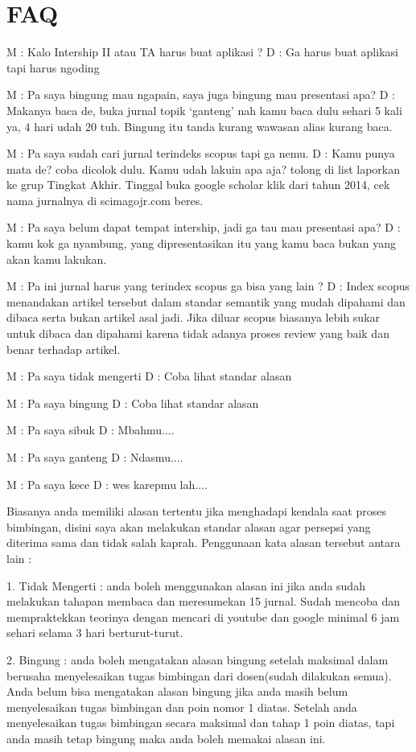 \chapter{FAQ}

M : Kalo Intership II atau TA harus buat aplikasi ?
D : Ga harus buat aplikasi tapi harus ngoding

M : Pa saya bingung mau ngapain, saya juga bingung mau presentasi apa?
D : Makanya baca de, buka jurnal topik `ganteng' nah kamu baca dulu sehari 5 kali ya, 4 hari udah 20 tuh. Bingung itu tanda kurang wawasan alias kurang baca.

M : Pa saya sudah cari jurnal terindeks scopus tapi ga nemu.
D : Kamu punya mata de? coba dicolok dulu. Kamu udah lakuin apa aja? tolong di list laporkan ke grup Tingkat Akhir. Tinggal buka google scholar klik dari tahun 2014, cek nama jurnalnya di scimagojr.com beres.

M : Pa saya belum dapat tempat intership, jadi ga tau mau presentasi apa?
D : kamu kok ga nyambung, yang dipresentasikan itu yang kamu baca bukan yang akan kamu lakukan.

M : Pa ini jurnal harus yang terindex scopus ga bisa yang lain ?
D : Index scopus menandakan artikel tersebut dalam standar semantik yang mudah dipahami dan dibaca serta bukan artikel asal jadi. Jika diluar scopus biasanya lebih sukar untuk dibaca dan dipahami karena tidak adanya proses review yang baik dan benar terhadap artikel.

M : Pa saya tidak mengerti
D : Coba lihat standar alasan

M : Pa saya bingung
D : Coba lihat standar alasan

M : Pa saya sibuk
D : Mbahmu....

M : Pa saya ganteng
D : Ndasmu....

M : Pa saya kece
D : wes karepmu lah....


Biasanya anda memiliki alasan tertentu jika menghadapi kendala saat proses bimbingan, disini saya akan melakukan standar alasan agar persepsi yang diterima sama dan tidak salah kaprah. Penggunaan kata alasan tersebut antara lain :

1. Tidak Mengerti : anda boleh menggunakan alasan ini jika anda sudah melakukan tahapan membaca dan meresumekan 15 jurnal. Sudah mencoba dan mempraktekkan teorinya dengan mencari di youtube dan google minimal 6 jam sehari selama 3 hari berturut-turut.

2. Bingung : anda boleh mengatakan alasan bingung setelah maksimal dalam berusaha menyelesaikan tugas bimbingan dari dosen(sudah dilakukan semua). Anda belum bisa mengatakan alasan bingung jika anda masih belum menyelesaikan tugas bimbingan dan poin nomor 1 diatas. Setelah anda menyelesaikan tugas bimbingan secara maksimal dan tahap 1 poin diatas, tapi anda masih tetap bingung maka anda boleh memakai alasan ini.

   
    